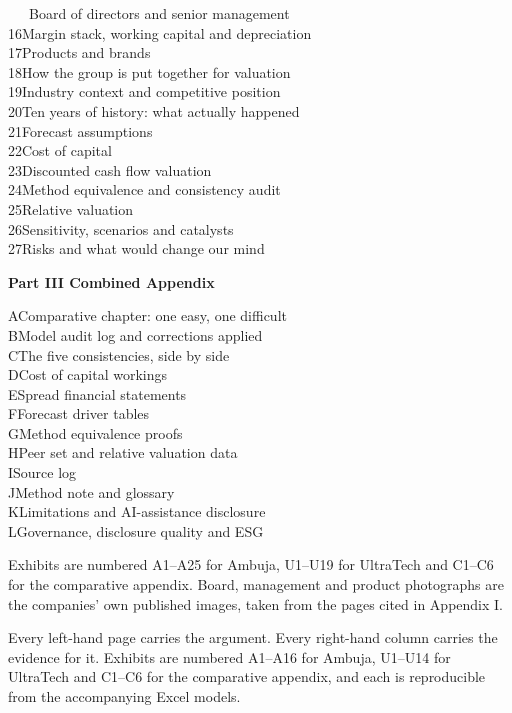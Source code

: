 \begin{minipage}[t]{0.48\textwidth}
{\quad\ \ \ Board of directors and senior management\\
16\quad Margin stack, working capital and depreciation\\
17\quad Products and brands\\
18\quad How the group is put together for valuation\\
19\quad Industry context and competitive position\\
20\quad Ten years of history: what actually happened\\
21\quad Forecast assumptions\\
22\quad Cost of capital\\
23\quad Discounted cash flow valuation\\
24\quad Method equivalence and consistency audit\\
25\quad Relative valuation\\
26\quad Sensitivity, scenarios and catalysts\\
27\quad Risks and what would change our mind\par}
\end{minipage}\hfill
\begin{minipage}[t]{0.48\textwidth}
{\bfseries\color{navy}Part III \quad Combined Appendix}\\[2mm]
{\footnotesize
A\quad Comparative chapter: one easy, one difficult\\
B\quad Model audit log and corrections applied\\
C\quad The five consistencies, side by side\\
D\quad Cost of capital workings\\
E\quad Spread financial statements\\
F\quad Forecast driver tables\\
G\quad Method equivalence proofs\\
H\quad Peer set and relative valuation data\\
I\quad Source log\\
J\quad Method note and glossary\\
K\quad Limitations and AI-assistance disclosure\\
L\quad Governance, disclosure quality and ESG\par}
\vspace{4mm}
{\footnotesize\color{ash}Exhibits are numbered A1--A25 for Ambuja, U1--U19 for
UltraTech and C1--C6 for the comparative appendix. Board, management and product
photographs are the companies' own published images, taken from the pages cited in
Appendix I.\par}
\vspace{8mm}
\begin{notebox}
Every left-hand page carries the argument. Every right-hand column carries the
evidence for it. Exhibits are numbered A1--A16 for Ambuja, U1--U14 for UltraTech
and C1--C6 for the comparative appendix, and each is reproducible from the
accompanying Excel models.
\end{notebox}
\end{minipage}
\newpage
